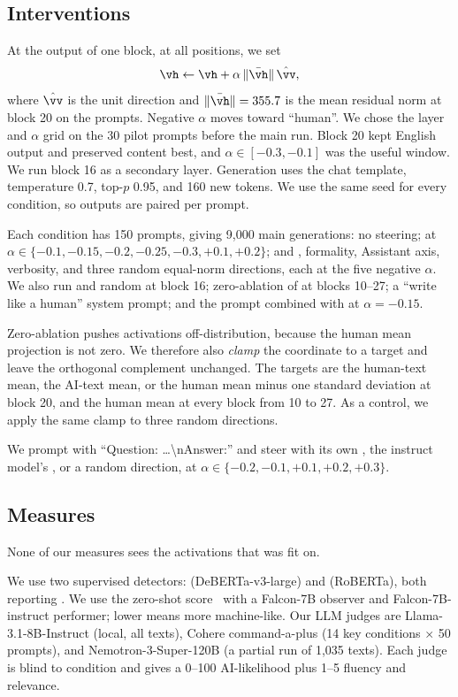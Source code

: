 \subsection{Interventions}
 At the output of one block, at all positions, we set
\begin{equation}
\vh \leftarrow \vh + \alpha\,\|\bar\vh\|\,\hat\vv,
\end{equation}
where $\hat\vv$ is the unit direction and $\|\bar\vh\|=355.7$ is the mean residual norm at block 20 on the prompts. Negative $\alpha$ moves toward ``human''. We chose the layer and $\alpha$ grid on the 30 pilot prompts before the main run. Block 20 kept English output and preserved content best, and $\alpha\in[-0.3,-0.1]$ was the useful window. We run block 16 as a secondary layer.
Generation uses the chat template, temperature 0.7, top-$p$ 0.95, and 160 new tokens. We use the same seed for every condition, so outputs are paired per prompt.

 Each condition has 150 prompts, giving 9,000 main generations:
no steering; \dai at $\alpha\in\{-0.1,-0.15,-0.2,-0.25,-0.3,+0.1,+0.2\}$; and \daiperp, formality, Assistant axis, verbosity, and three random equal-norm directions, each at the five negative $\alpha$.
We also run \dai and random at block 16; zero-ablation of \dai at blocks 10--27; a ``write like a human'' system prompt; and the prompt combined with \dai at $\alpha=-0.15$.

 Zero-ablation pushes activations off-distribution, because the human mean projection is not zero. We therefore also \emph{clamp} the \dai coordinate to a target and leave the orthogonal complement unchanged. The targets are the human-text mean, the AI-text mean, or the human mean minus one standard deviation at block 20, and the human mean at every block from 10 to 27. As a control, we apply the same clamp to three random directions.

 We prompt \qwenbase with ``Question: \ldots\textbackslash nAnswer:'' and steer with its own \daibase, the instruct model's \daiinst, or a random direction, at $\alpha\in\{-0.2,-0.1,+0.1,+0.2,+0.3\}$.

\subsection{Measures}
\label{sec:measures}
None of our measures sees the activations that \dai was fit on.

 We use two supervised detectors: \desklib (DeBERTa-v3-large) and \fakespot (RoBERTa), both reporting \pai. We use the zero-shot \binoculars score~\citep{hans2024binoculars} with a Falcon-7B observer and Falcon-7B-instruct performer; lower means more machine-like. Our LLM judges are Llama-3.1-8B-Instruct (local, all texts), Cohere command-a-plus (14 key conditions $\times$ 50 prompts), and Nemotron-3-Super-120B (a partial run of 1,035 texts). Each judge is blind to condition and gives a 0--100 AI-likelihood plus 1--5 fluency and relevance.

